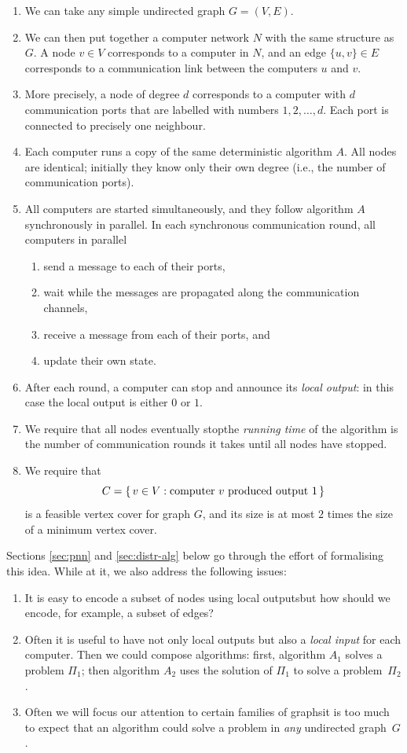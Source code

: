 \begin{enumerate}
    \item We can take any simple undirected graph $G = (V,E)$.
    \item We can then put together a computer network $N$ with the same structure as $G$. A node $v \in V$ corresponds to a computer in $N$, and an edge $\{u,v\} \in E$ corresponds to a communication link between the computers $u$ and $v$.
    \item More precisely, a node of degree $d$ corresponds to a computer with $d$ communication ports that are labelled with numbers $1, 2, \dotsc, d$. Each port is connected to precisely one neighbour.
    \item Each computer runs a copy of the same deterministic algorithm $A$. All nodes are identical; initially they know only their own degree (i.e., the number of communication ports).
    \item All computers are started simultaneously, and they follow algorithm $A$ synchronously in parallel. In each synchronous communication round, all computers in parallel
    \begin{enumerate}[label=(\arabic*)]
        \item send a message to each of their ports,
        \item wait while the messages are propagated along the communication channels,
        \item receive a message from each of their ports, and
        \item update their own state.
    \end{enumerate}
    \item After each round, a computer can stop and announce its \emph{local output}: in this case the local output is either $0$ or $1$.
    \item We require that all nodes eventually stop\mydash the \emph{running time} of the algorithm is the number of communication rounds it takes until all nodes have stopped.
    \item We require that
        \[ C = \{\,  v \in V : \text{computer $v$ produced output $1$}  \,\} \]
        is a feasible vertex cover for graph $G$, and its size is at most $2$ times the size of a minimum vertex cover. 
\end{enumerate}
Sections \ref{sec:pnn} and \ref{sec:distr-alg} below go through the effort of formalising this idea. While at it, we also address the following issues:
\begin{enumerate}
    \item It is easy to encode a subset of nodes using local outputs\mydash but how should we encode, for example, a subset of edges?
    \item Often it is useful to have not only local outputs but also a \emph{local input} for each computer. Then we could compose algorithms: first, algorithm $A_1$ solves a problem $\Pi_1$; then algorithm $A_2$ uses the solution of $\Pi_1$ to solve a problem~$\Pi_2$.
    \item Often we will focus our attention to certain families of graphs\mydash it is too much to expect that an algorithm could solve a problem in \emph{any} undirected graph~$G$.
\end{enumerate}

